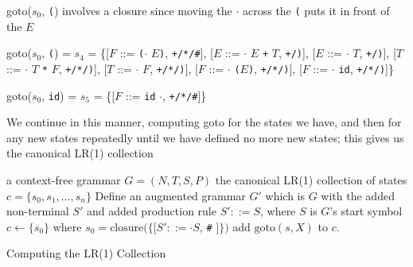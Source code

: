 \documentclass[8pt,a4paper,compress]{beamer}
\newcommand{\mm}[1]{$#1$}
\newcommand{\subs}[2]{${#1}_{#2}$}
\newenvironment{spaced}
{
\smallskip
\hspace{.5cm}
\begin{minipage}[c]{\textwidth}
}
{
\end{minipage}
\smallskip
}
\begin{document}
\begin{frame}[fragile]
\pause

\text{ }
\begin{spaced}
\begin{production}
goto(\subs{s}{0}, \lstinline{(}) involves a closure since moving the \mm{\cdot} across the \lstinline{(} puts it in front of the \mm{E}

goto(\subs{s}{0}, \lstinline{(}) = \subs{s}{4}
               = \{[\mm{F}  ::= \lstinline{(}\mm{\cdot} \mm{E}\lstinline{)},  \lstinline{+/*/#}],
                    [\mm{E}  ::= \mm{\cdot} \mm{E} \lstinline{+} \mm{T}, \lstinline{+/)}],
                    [\mm{E}  ::= \mm{\cdot} \mm{T}, \lstinline{+/)}],
                    [\mm{T}  ::= \mm{\cdot} \mm{T} \lstinline{*} \mm{F}, \lstinline{+/*/)}],
                    [\mm{T}  ::= \mm{\cdot} \mm{F}, \lstinline{+/*/)}],
                    [\mm{F}  ::= \mm{\cdot} \lstinline{(}\mm{E}\lstinline{)}, \lstinline{+/*/)}],
                    [\mm{F}  ::= \mm{\cdot} \lstinline{id}, \lstinline{+/*/)}]\}

goto(\subs{s}{0}, \lstinline{id}) = \subs{s}{5}
                = \{[\mm{F}  ::= \lstinline{id} \mm{\cdot}, \lstinline{+/*/#}]\}
\end{production}
\end{spaced}

\pause

We continue in this manner, computing goto for the states we have, and then for any new states repeatedly until we have defined no more new states; this gives us the canonical LR(1) collection
\end{frame}

\begin{frame}[fragile]
\pause

\begin{algorithm}[H]
\begin{algorithmic}
\REQUIRE a context-free grammar $G = (N,T,S,P)$
\ENSURE the canonical LR(1) collection of states $c = \{s_0, s_1, \dots, s_n\}$
\STATE Define an augmented grammar $G'$ which is $G$ with the added non-terminal $S'$ and added production rule $S' ::= S$, where $S$ is $G$'s start symbol
\STATE $c \gets \{s_0\}$ where $s_0 = \text{closure}(\{[S' ::= \cdot S$, \lstinline{#} $]\})$
\REPEAT
{}
\STATE add $\text{goto}(s, X)$ to $c$.
\ENDIF
\ENDFOR
{}
\end{algorithmic}
\caption{Computing the LR(1) Collection}
\end{algorithm}
\end{frame}
\end{document}
